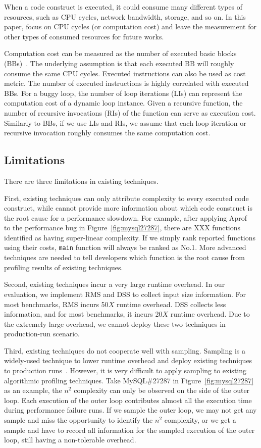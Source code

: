 When a code construct is executed,
it could consume many different types of resources, 
such as CPU cycles, network bandwidth, storage, and so on.
In this paper, focus on CPU cycles (or computation cost) 
and leave the measurement for other types of 
consumed resources for future works. 

Computation cost can be measured 
as the number of executed basic blocks (BBs)~\cite{Aprof1,Aprof2}.
The underlying assumption is that each executed 
BB will roughly consume the same CPU cycles. 
Executed instructions can also be used as cost metric. 
The number of executed instructions is highly correlated with executed BBs.
For a buggy loop, the number of loop iterations (LIs) can represent 
the computation cost of a dynamic loop instance.
Given a recursive function, the number of recursive invocations (RIs) 
of the function can serve as execution cost.
Similarly to BBs, if we use LIs and RIs, 
we assume that each loop iteration or recursive invocation 
roughly consumes the same computation cost. 

\subsection{Limitations}
\label{sec:limit}
There are three limitations in existing techniques. 

First, existing techniques can only 
attribute complexity to every executed code construct, 
while cannot provide more information about 
which code construct is the root cause 
for a performance slowdown. 
For example, after applying Aprof~\cite{Aprof1,Aprof2} 
to the performance bug in Figure~\ref{fig:mysql27287}, 
there are {\color{red} XXX} functions identified 
as having super-linear complexity. 
If we simply rank reported functions using their costs, 
\texttt{main} function will always be ranked as No.1. 
More advanced techniques are needed to tell developers 
which function is the root cause from profiling results of existing techniques. 

Second, existing techniques incur a very large runtime overhead. 
In our evaluation, we implement RMS and DSS to collect input size information. 
For most benchmarks, RMS incurs 50$X$ runtime overhead. 
DSS collects less information, and for most benchmarks, it incurs 20$X$ runtime overhead. 
Due to the extremely large overhead, 
we cannot deploy these two techniques in production-run scenario.   

Third, existing techniques do not cooperate well with sampling. 
Sampling is a widely-used technique to lower runtime overhead 
and deploy existing techniques to production runs~\cite{SongOOPSLA2014,liblit03,liblit05,CCI}. 
However, it is very difficult to apply sampling to existing algorithmic profiling techniques. 
Take MySQL\#27287 in Figure~\ref{fig:mysql27287} as an example,
the $n^2$ complexity can only be observed on the side of the outer loop. 
Each execution of the outer loop contributes almost all 
the execution time during performance failure runs. 
If we sample the outer loop, 
we may not get any sample and miss the opportunity to 
identify the $n^2$ complexity, or we get a sample and have to 
record all 
information for the sampled execution of the outer loop, 
still having a non-tolerable overhead. 
